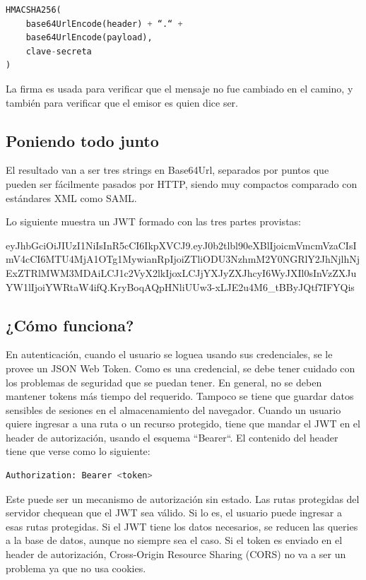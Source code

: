 \begin{lstlisting}[language=Python]
HMACSHA256(
    base64UrlEncode(header) + “.“ +
    base64UrlEncode(payload),
    clave-secreta
)
\end{lstlisting}
La firma es usada para verificar que el mensaje no fue cambiado en el camino, y también para verificar que el emisor es quien dice ser.

\subsection[Poniendo todo junto]{Poniendo todo junto}

El resultado van a ser tres strings en Base64Url, separados por puntos que pueden ser fácilmente pasados por HTTP, siendo muy compactos comparado con estándares XML como SAML.

Lo siguiente muestra un JWT formado con las tres partes provistas:


eyJhbGciOiJIUzI1NiIsInR5cCI6IkpXVCJ9.\break eyJ0b2tlbl90eXBlIjoicmVmcmVzaCIsImV4cCI6MTU4MjA1OTg1MywianRpIj\break oiZTliODU3NzhmM2Y0NGRlY2JhNjlhNjExZTRlMWM3MDAiLCJ1c2VyX2lkIj\break oxLCJjYXJyZXJhcyI6WyJXIl0sInVzZXJuYW1lIjoiYWRtaW4ifQ.\break KryBoqAQpHNliUUw3-xLJE2u4M6\_tBByJQtf7IFYQis



\subsection[¿Cómo funciona?]{¿Cómo funciona?}

En autenticación, cuando el usuario se loguea usando sus credenciales, se le provee un JSON Web Token. Como es una credencial, se debe tener cuidado con los problemas de seguridad que se puedan tener. En general, no se deben mantener tokens más tiempo del requerido. Tampoco se tiene que guardar datos sensibles de sesiones en el almacenamiento del navegador.
Cuando un usuario quiere ingresar a una ruta o un recurso protegido, tiene que mandar el JWT en el header de autorización, usando el esquema “Bearer“. El contenido del header tiene que verse como lo siguiente:
\begin{lstlisting}[language=Python]
Authorization: Bearer <token>
\end{lstlisting}

Este puede ser un mecanismo de autorización sin estado. Las rutas protegidas del servidor chequean que el JWT sea válido. Si lo es, el usuario puede ingresar a esas rutas protegidas. Si el JWT tiene los datos necesarios, se reducen las queries a la base de datos, aunque no siempre sea el caso.
Si el token es enviado en el header de autorización, Cross-Origin Resource Sharing (CORS) no va a ser un problema ya que no usa cookies.


